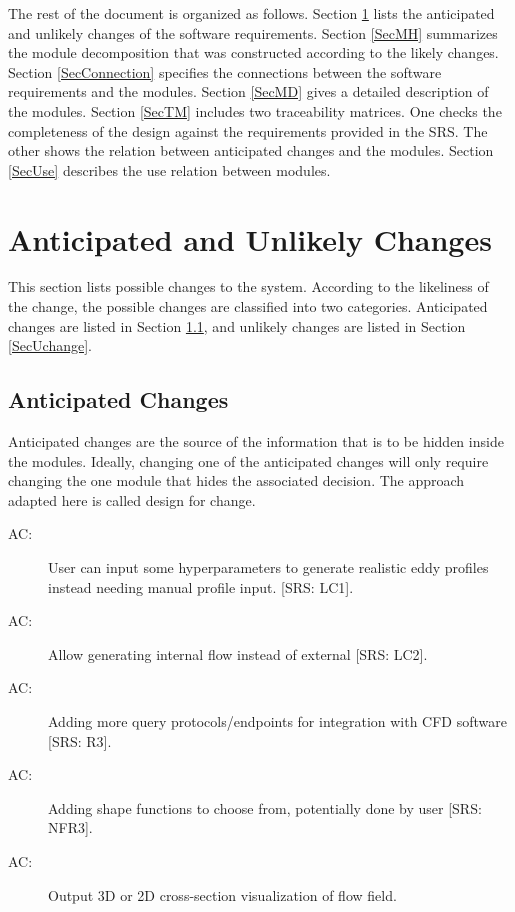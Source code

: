 \documentclass[12pt, titlepage]{article}
\newcounter{acnum}
\newcommand{\actheacnum}{AC\theacnum}
\begin{document}
The rest of the document is organized as follows. Section
\ref{SecChange} lists the anticipated and unlikely changes of the software
requirements. Section \ref{SecMH} summarizes the module decomposition that
was constructed according to the likely changes. Section \ref{SecConnection}
specifies the connections between the software requirements and the
modules. Section \ref{SecMD} gives a detailed description of the
modules. Section \ref{SecTM} includes two traceability matrices. One checks
the completeness of the design against the requirements provided in the SRS. The
other shows the relation between anticipated changes and the modules. Section
\ref{SecUse} describes the use relation between modules.

\section{Anticipated and Unlikely Changes} \label{SecChange}

This section lists possible changes to the system. According to the likeliness
of the change, the possible changes are classified into two
categories. Anticipated changes are listed in Section \ref{SecAchange}, and
unlikely changes are listed in Section \ref{SecUchange}.

\subsection{Anticipated Changes} \label{SecAchange}

Anticipated changes are the source of the information that is to be hidden
inside the modules. Ideally, changing one of the anticipated changes will only
require changing the one module that hides the associated decision. The approach
adapted here is called design for
change.

\begin{description}
\item[ \actheacnum \label{acRealEddy}:] User can input some hyperparameters to generate realistic eddy profiles instead needing manual profile input. [SRS: LC1].
\item[ \actheacnum \label{acInternal}:] Allow generating internal flow instead of external [SRS: LC2].
\item[ \actheacnum \label{acQuery}:] Adding more query protocols/endpoints for integration with CFD software [SRS: R3].
\item[ \actheacnum \label{acShape}:] Adding shape functions to choose from, potentially done by user [SRS: NFR3].
\item[ \actheacnum \label{acVisual}:] Output 3D or 2D cross-section visualization of flow field.
\end{description}
\end{document}
